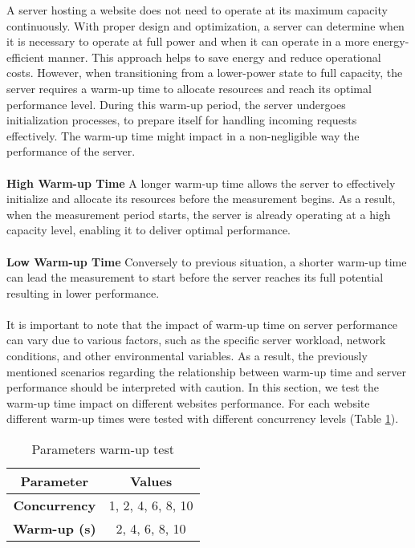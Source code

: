 A server hosting a website does not need to operate at its maximum capacity continuously. With proper design and optimization, 
a server can determine when it is necessary to operate at full power and when it can operate in a more energy-efficient manner. 
This approach helps to save energy and reduce operational costs.
However, when transitioning from a lower-power state to full capacity, the server requires a warm-up time to allocate 
resources and reach its optimal performance level. During this warm-up period, the server undergoes initialization processes, 
to prepare itself for handling incoming requests effectively. The warm-up time might impact in a non-negligible way the
performance of the server.\\
\\
\textbf{High Warm-up Time}
A longer warm-up time allows the server to effectively initialize and allocate its resources before the measurement begins. As a 
result, when the measurement period starts, the server is already operating at a high capacity level, enabling it to deliver 
optimal performance.\\
\\
\textbf{Low Warm-up Time}
Conversely to previous situation, a shorter warm-up time can lead the measurement to start before the server reaches
its full potential resulting in lower performance.\\
\\
It is important to note that the impact of warm-up time on server performance can vary due to various factors, such as the specific 
server workload, network conditions, and other environmental variables. As a result, the previously mentioned scenarios regarding the 
relationship between warm-up time and server performance should be interpreted with caution. In this section, we test the warm-up time
impact on different websites performance. For each website different warm-up times were tested with different concurrency levels
(Table \ref{tab:param_warmup}). 

    \begin{table}[H]
        \centering
            \begin{tabular}{|c|c|}
            \hline
            \rowcolor{pyblue!60}
            \textbf{Parameter} & \textbf{Values} \\
            \hline
            \textbf{Concurrency} & 1, 2, 4, 6, 8, 10 \\
            \textbf{Warm-up (s)} & 2, 4, 6, 8, 10 \\
            \hline
            \end{tabular}
            \caption{\small Parameters warm-up test}
            \label{tab:param_warmup}
    \end{table}

